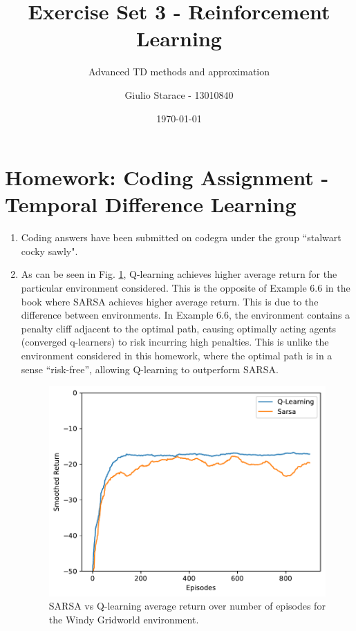 \documentclass{article}
\title{Exercise Set 3 - Reinforcement Learning}
\subtitle{Advanced TD methods and approximation}
\author{Giulio Starace - 13010840}
\date{\today}
\begin{document}
\maketitle
\section*{Homework: Coding Assignment - Temporal Difference Learning}
\begin{enumerate}
	\item Coding answers have been submitted on codegra under the group ``stalwart cocky sawly".
	\item As can be seen in Fig. \ref{fig:sarsa_v_qlearning}, Q-learning achieves higher average
	      return for the particular environment considered. This is the opposite of Example 6.6 in the
	      book where SARSA achieves higher average return. This is due to the difference between
	      environments. In Example 6.6, the environment contains a penalty cliff adjacent to the
	      optimal path, causing optimally acting agents (converged q-learners) to risk incurring high
	      penalties. This is unlike the environment considered in this homework, where the optimal
	      path is in a sense ``risk-free'', allowing Q-learning to outperform SARSA.
	      \begin{figure}[ht]
		      \centering
		      \includegraphics[width=\textwidth]{sarsa_v_qlearning}
		      \caption{SARSA vs Q-learning average return over number of episodes for the Windy
			      Gridworld environment.}
		      \label{fig:sarsa_v_qlearning}
	      \end{figure}
\end{enumerate}
\end{document}
